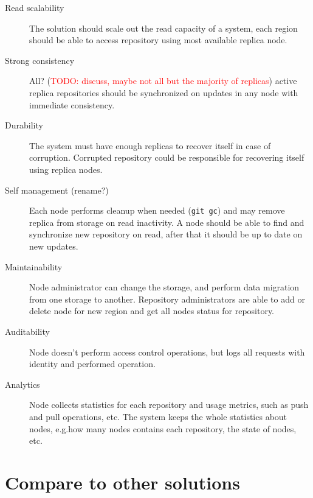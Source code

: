 \documentclass[acmlarge, screen, nonacm]{acmart}
\newcommand{\code}[1]{\texttt{#1}}
\newcommand{\todo}[1]{\textcolor{red}{TODO: #1}}
\begin{document}
\begin{description}
  \item[Read scalability]
    The solution should scale out the read capacity of a system, each region should be able
    to access repository using most available replica node.
  \item[Strong consistency]
    All? (\todo{discuss, maybe not all but the majority of replicas})
    active replica repositories should be synchronized on updates in any node
    with immediate consistency.
  \item[Durability]
    The system must have enough replicas to recover itself in case of corruption.
    Corrupted repository could be responsible for recovering itself using replica nodes.
  \item[Self management (rename?)]
    Each node performs cleanup when needed (\code{git gc}) and may remove replica
    from storage on read inactivity.
    A node should be able to find and synchronize new repository on read,
    after that it should be up to date on new updates.
  \item[Maintainability]
    Node administrator can change the storage, and perform data migration from one storage
    to another.
    Repository administrators are able to add or delete node for new region and
    get all nodes status for repository.
  \item[Auditability]
    Node doesn't perform access control operations, but logs all
    requests with identity and performed operation.
  \item[Analytics]
    Node collects statistics for each repository and usage metrics, such as
    push and pull operations, etc. The system keeps the whole statistics about
    nodes, e.g.\@ how many nodes contains each repository, the state of nodes, etc.
\end{description}

\section{Compare to other solutions}
\end{document}
